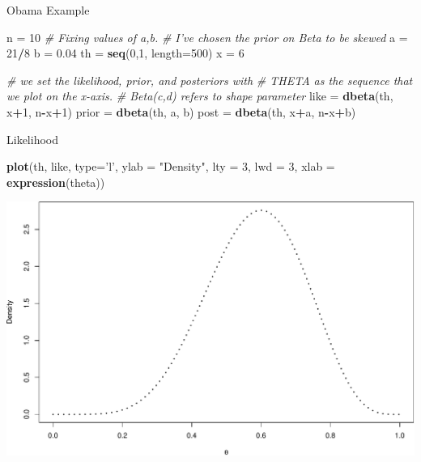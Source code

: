 \documentclass[
  ignorenonframetext,
]{beamer}
\newenvironment{Shaded}{\begin{snugshade}}{\end{snugshade}}
\newcommand{\CommentTok}[1]{\textcolor[rgb]{0.56,0.35,0.01}{\textit{#1}}}
\newcommand{\DataTypeTok}[1]{\textcolor[rgb]{0.13,0.29,0.53}{#1}}
\newcommand{\DecValTok}[1]{\textcolor[rgb]{0.00,0.00,0.81}{#1}}
\newcommand{\FloatTok}[1]{\textcolor[rgb]{0.00,0.00,0.81}{#1}}
\newcommand{\KeywordTok}[1]{\textcolor[rgb]{0.13,0.29,0.53}{\textbf{#1}}}
\newcommand{\NormalTok}[1]{#1}
\newcommand{\OperatorTok}[1]{\textcolor[rgb]{0.81,0.36,0.00}{\textbf{#1}}}
\newcommand{\StringTok}[1]{\textcolor[rgb]{0.31,0.60,0.02}{#1}}
\begin{document}
\begin{frame}[fragile]{Obama Example}
\protect\hypertarget{obama-example}{}

\begin{Shaded}
\begin{Highlighting}[]
\NormalTok{n =}\StringTok{ }\DecValTok{10}
\CommentTok{# Fixing values of a,b. }
\CommentTok{# I've chosen the prior on Beta to be skewed}
\NormalTok{a =}\StringTok{ }\DecValTok{21}\OperatorTok{/}\DecValTok{8}
\NormalTok{b =}\StringTok{ }\FloatTok{0.04}
\NormalTok{th =}\StringTok{ }\KeywordTok{seq}\NormalTok{(}\DecValTok{0}\NormalTok{,}\DecValTok{1}\NormalTok{, }\DataTypeTok{length=}\DecValTok{500}\NormalTok{)}
\NormalTok{x =}\StringTok{ }\DecValTok{6}

\CommentTok{# we set the likelihood, prior, and posteriors with }
\CommentTok{# THETA as the sequence that we plot on the x-axis.}
\CommentTok{# Beta(c,d) refers to shape parameter}
\NormalTok{like =}\StringTok{ }\KeywordTok{dbeta}\NormalTok{(th, x}\OperatorTok{+}\DecValTok{1}\NormalTok{, n}\OperatorTok{-}\NormalTok{x}\OperatorTok{+}\DecValTok{1}\NormalTok{)}
\NormalTok{prior =}\StringTok{ }\KeywordTok{dbeta}\NormalTok{(th, a, b)}
\NormalTok{post =}\StringTok{ }\KeywordTok{dbeta}\NormalTok{(th, x}\OperatorTok{+}\NormalTok{a, n}\OperatorTok{-}\NormalTok{x}\OperatorTok{+}\NormalTok{b)}
\end{Highlighting}
\end{Shaded}

\end{frame}

\begin{frame}[fragile]{Likelihood}
\protect\hypertarget{likelihood-1}{}

\begin{Shaded}
\begin{Highlighting}[]
\KeywordTok{plot}\NormalTok{(th, like, }\DataTypeTok{type=}\StringTok{'l'}\NormalTok{, }\DataTypeTok{ylab =} \StringTok{"Density"}\NormalTok{, }
     \DataTypeTok{lty =} \DecValTok{3}\NormalTok{, }\DataTypeTok{lwd =} \DecValTok{3}\NormalTok{, }\DataTypeTok{xlab =} \KeywordTok{expression}\NormalTok{(theta))}
\end{Highlighting}
\end{Shaded}

\includegraphics{01-intro-to-Bayes_files/figure-beamer/unnamed-chunk-2-1.pdf}

\end{frame}
\end{document}
